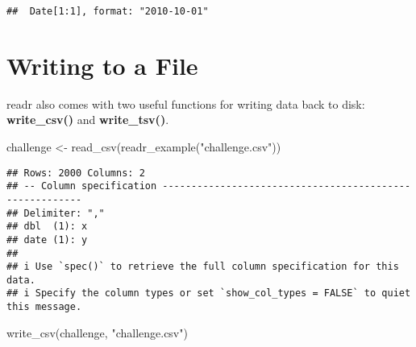\documentclass[
]{article}
\newenvironment{Shaded}{\begin{snugshade}}{\end{snugshade}}
\newcommand{\FunctionTok}[1]{\textcolor[rgb]{0.00,0.00,0.00}{#1}}
\newcommand{\NormalTok}[1]{#1}
\newcommand{\OtherTok}[1]{\textcolor[rgb]{0.56,0.35,0.01}{#1}}
\newcommand{\StringTok}[1]{\textcolor[rgb]{0.31,0.60,0.02}{#1}}
\begin{document}
\begin{verbatim}
##  Date[1:1], format: "2010-10-01"
\end{verbatim}

\hypertarget{writing-to-a-file}{%
\section{\texorpdfstring{\textbf{Writing to a
File}}{Writing to a File}}\label{writing-to-a-file}}

readr also comes with two useful functions for writing data back to
disk: \textbf{write\_csv()} and \textbf{write\_tsv()}.

\begin{Shaded}
\begin{Highlighting}[]
\NormalTok{challenge }\OtherTok{\textless{}{-}} \FunctionTok{read\_csv}\NormalTok{(}\FunctionTok{readr\_example}\NormalTok{(}\StringTok{"challenge.csv"}\NormalTok{))}
\end{Highlighting}
\end{Shaded}

\begin{verbatim}
## Rows: 2000 Columns: 2
## -- Column specification --------------------------------------------------------
## Delimiter: ","
## dbl  (1): x
## date (1): y
## 
## i Use `spec()` to retrieve the full column specification for this data.
## i Specify the column types or set `show_col_types = FALSE` to quiet this message.
\end{verbatim}

\begin{Shaded}
\begin{Highlighting}[]
\FunctionTok{write\_csv}\NormalTok{(challenge, }\StringTok{"challenge.csv"}\NormalTok{)}
\end{Highlighting}
\end{Shaded}
\end{document}
